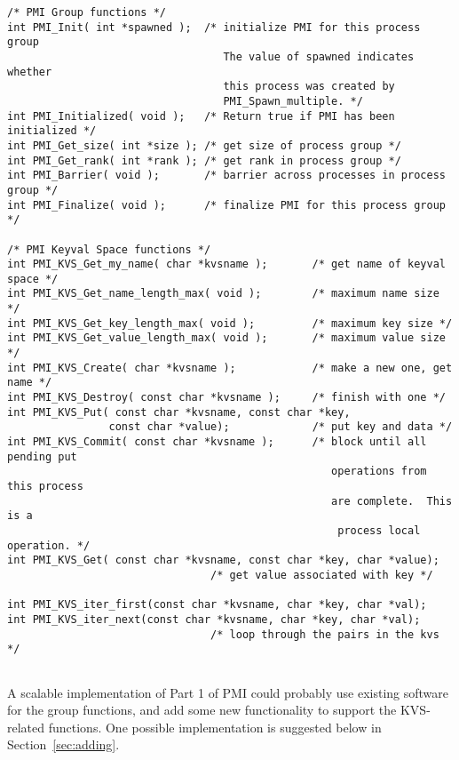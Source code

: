 \documentclass[11pt]{article}
\begin{document}
\begin{small}
\begin{verbatim}
/* PMI Group functions */
int PMI_Init( int *spawned );  /* initialize PMI for this process group
                                  The value of spawned indicates whether
                                  this process was created by
                                  PMI_Spawn_multiple. */
int PMI_Initialized( void );   /* Return true if PMI has been initialized */
int PMI_Get_size( int *size ); /* get size of process group */
int PMI_Get_rank( int *rank ); /* get rank in process group */
int PMI_Barrier( void );       /* barrier across processes in process group */
int PMI_Finalize( void );      /* finalize PMI for this process group */

/* PMI Keyval Space functions */
int PMI_KVS_Get_my_name( char *kvsname );       /* get name of keyval space */
int PMI_KVS_Get_name_length_max( void );        /* maximum name size */
int PMI_KVS_Get_key_length_max( void );         /* maximum key size */
int PMI_KVS_Get_value_length_max( void );       /* maximum value size */
int PMI_KVS_Create( char *kvsname );            /* make a new one, get name */
int PMI_KVS_Destroy( const char *kvsname );     /* finish with one */
int PMI_KVS_Put( const char *kvsname, const char *key,
                const char *value);             /* put key and data */
int PMI_KVS_Commit( const char *kvsname );      /* block until all pending put
                                                   operations from this process
                                                   are complete.  This is a
                                                    process local operation. */
int PMI_KVS_Get( const char *kvsname, const char *key, char *value); 
                                /* get value associated with key */

int PMI_KVS_iter_first(const char *kvsname, char *key, char *val);
int PMI_KVS_iter_next(const char *kvsname, char *key, char *val);
                                /* loop through the pairs in the kvs */
                             
\end{verbatim}
\end{small}

A scalable implementation of Part 1 of PMI could probably use existing software
for the group functions, and add some new functionality to support the
KVS-related functions.  One possible implementation is suggested below
in Section~\ref{sec:adding}.
\end{document}

